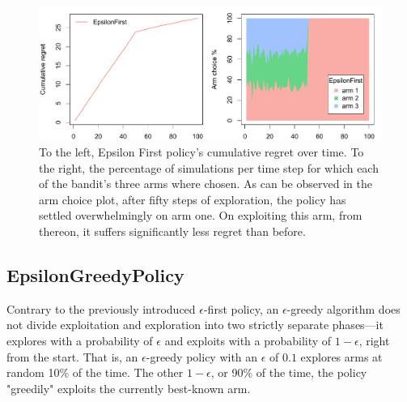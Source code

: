 \documentclass{jss}
\begin{document}
\begin{figure}[H]
\centering
\includegraphics[width=.99\textwidth]{fig/section_5_2}
\caption{To the left, Epsilon First policy's cumulative regret over time. To the right, the percentage of simulations per time step for which each of the bandit's three arms where chosen. As can be observed in the arm choice plot, after fifty steps of exploration, the policy has settled overwhelmingly on arm one. On exploiting this arm, from thereon, it suffers significantly less regret than before.}
\label{fig:section_5_2}
\end{figure}


\subsection{EpsilonGreedyPolicy} \label{epsgreedy}

Contrary to the previously introduced $\epsilon$-first policy, an $\epsilon$-greedy algorithm \citep{Sutton1998e} does not divide exploitation and exploration into two strictly separate phases---it explores with a probability of $\epsilon$ and exploits with a probability of $1-\epsilon$, right from the start. That is, an $\epsilon$-greedy policy with an $\epsilon$ of $0.1$ explores arms at random 10\% of the time. The other $1-\epsilon$, or 90\% of the time, the policy "greedily" exploits the currently best-known arm.
\end{document}
